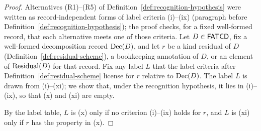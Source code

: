 \begin{proof}
Alternatives (R1)--(R5) of Definition~\ref{def:recognition-hypothesis} were
written as record-independent forms of label criteria (i)--(ix) (paragraph
before Definition~\ref{def:recognition-hypothesis}); the proof checks, for a
fixed well-formed record, that each alternative meets one of those criteria.
Let \(D\in\mathsf{FATCD}{}\), fix a well-formed decomposition record
\(\operatorname{Dec}\!\left(D\right)\), and let \(r\) be a kind residual of \(D\)
(Definition~\ref{def:residual-scheme}), a bookkeeping annotation of \(D\), or an element of
\(\operatorname{Residual}\!\left(D\right)\) for that record. Fix any label
\(L\) that the label criteria after Definition~\ref{def:residual-scheme}
license for \(r\) relative to \(\operatorname{Dec}\!\left(D\right)\). The label \(L\) is drawn from
(i)--(xi); we show that, under the recognition hypothesis, it lies in
(i)--(ix), so that (x) and (xi) are empty.

By the label table, \(L\) is (x) only if no criterion (i)--(ix) holds for
\(r\), and \(L\) is (xi) only if \(r\) has the property in (x).


\end{proof}
